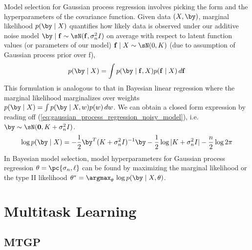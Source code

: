 \documentclass[11pt]{article}
\begin{document}
Model selection for Gaussian process regression involves picking the form and the hyperparameters of the covariance function. Given data $(X,\by)$, marginal likelihood $p(\by\mid X)$ quantifies how likely data is observed under our additive noise model $\by\mid \mathbf{f} \sim \sN(\mathbf{f},\sigma_n^2 I)$ on average with respect to latent function values (or parameters of our model) $\mathbf{f}\mid X \sim \sN(0,K)$ (due to assumption of Gaussian process prior over f),
\begin{align}
    p(\by\mid X)
        = \int p(\by\mid \mathbf{f},X) p(\mathbf{f}\mid X) \, d\mathbf{f}
\end{align}
This formulation is analogous to that in Bayesian linear regression where the marginal likelihood marginalizes over weights $p(\by\mid X) = \int p(\by\mid X,w)p(w) \, dw$. We can obtain a closed form expression by reading off (\ref{eq:gaussian_process_regression_noisy_model}), i.e. $\by \sim \sN(\mathbf{0}, K+\sigma_n^2 I)$. 
\begin{align}
    \log p(\by\mid X)
        = -\frac{1}{2} \by^T  (K+\sigma_n^2 I)^{-1}\by - \frac{1}{2} \log |K+\sigma_n^2I| - \frac{n}{2} \log 2\pi 
    \label{eq:gp_regression_marginal_likelihood}
\end{align}
In Bayesian model selection, model hyperparameters for Gaussian process regression $\theta = \pc{\sigma_n, \ell}$ can be found by maximizing the marginal likelihood or the type II likelihood $\theta^* = \argmax_{\theta}\, \log p(\by\mid X, \theta)$.



\section{Multitask Learning}

\subsection{MTGP}
\end{document}
